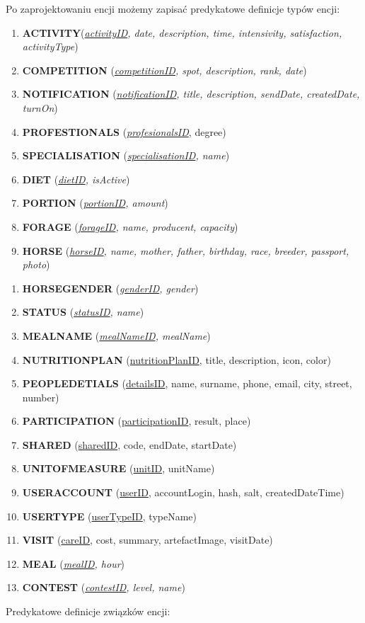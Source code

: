 \documentclass[12pt,oneside]{report}
\begin{document}
\newpage
Po zaprojektowaniu encji możemy zapisać predykatowe definicje typów encji:
\begin{enumerate}[start=1,label={\bfseries ENC$\backslash$0\arabic*}]
	\item \textbf{ACTIVITY}(\textit{\underline{activityID}, date, description, time, intensivity, satisfaction, activityType})
	\item \textbf{COMPETITION} (\textit{\underline{competitionID}, spot, description, rank, date})
	\item \textbf{NOTIFICATION} (\textit{\underline{notificationID}, title, description, sendDate, createdDate, turnOn})
	\item \textbf{PROFESTIONALS} (\textit{\underline{profesionalsID}}, degree)
	\item \textbf{SPECIALISATION} (\textit{\underline{specialisationID}, name})
	\item \textbf{DIET} (\textit{\underline{dietID}, isActive})
	\item \textbf{PORTION} (\textit{\underline{portionID}, amount})
	\item \textbf{FORAGE} (\textit{\underline{forageID}, name, producent, capacity})
	\item \textbf{HORSE} (\textit{\underline{horseID}, name, mother, father, birthday, race, breeder, passport, photo})
\end{enumerate}
\begin{enumerate}[start=10,label={\bfseries ENC$\backslash$\arabic*}]
	\item \textbf{HORSEGENDER} (\textit{\underline{genderID}, gender})
	\item \textbf{STATUS} (\textit{\underline{statusID}, name})
	\item \textbf{MEALNAME} (\textit{\underline{mealNameID}, mealName})
	\item \textbf{NUTRITIONPLAN} (\underline{nutritionPlanID}, title, description, icon, color)
	\item \textbf{PEOPLEDETIALS} (\underline{detailsID}, name, surname, phone, email, city, street, number)
	\item \textbf{PARTICIPATION} (\underline{participationID}, result, place)
	\item \textbf{SHARED} (\underline{sharedID}, code, endDate, startDate)
	\item \textbf{UNITOFMEASURE} (\underline{unitID}, unitName)
	\item \textbf{USERACCOUNT} (\underline{userID}, accountLogin, hash, salt, createdDateTime)
	\item \textbf{USERTYPE} (\underline{userTypeID}, typeName)
	\item \textbf{VISIT} (\underline{careID}, cost, summary, artefactImage, visitDate)
    \item \textbf{MEAL} (\textit{\underline{mealID}, hour})    
    \item \textbf{CONTEST} (\textit{\underline{contestID}, level, name})
\end{enumerate}
\newpage
	Predykatowe definicje związków encji:
\end{document}
